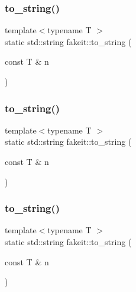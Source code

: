 \mbox{\label{namespacefakeit_a9004af88fd6282c85adc4aa7495b9cbe}} 
\subsubsection{\texorpdfstring{to\_string()}{to\_string()}\hspace{0.1cm}{\footnotesize\ttfamily [2/9]}}
{\footnotesize\ttfamily template$<$typename T $>$ \\
static std\+::string fakeit\+::to\+\_\+string (\begin{DoxyParamCaption}\item[{const T \&}]{n }\end{DoxyParamCaption})\hspace{0.3cm}{\ttfamily [static]}}

\mbox{\label{namespacefakeit_a9004af88fd6282c85adc4aa7495b9cbe}} 
\subsubsection{\texorpdfstring{to\_string()}{to\_string()}\hspace{0.1cm}{\footnotesize\ttfamily [3/9]}}
{\footnotesize\ttfamily template$<$typename T $>$ \\
static std\+::string fakeit\+::to\+\_\+string (\begin{DoxyParamCaption}\item[{const T \&}]{n }\end{DoxyParamCaption})\hspace{0.3cm}{\ttfamily [static]}}

\mbox{\label{namespacefakeit_a9004af88fd6282c85adc4aa7495b9cbe}} 
\subsubsection{\texorpdfstring{to\_string()}{to\_string()}\hspace{0.1cm}{\footnotesize\ttfamily [4/9]}}
{\footnotesize\ttfamily template$<$typename T $>$ \\
static std\+::string fakeit\+::to\+\_\+string (\begin{DoxyParamCaption}\item[{const T \&}]{n }\end{DoxyParamCaption})\hspace{0.3cm}{\ttfamily [static]}}

